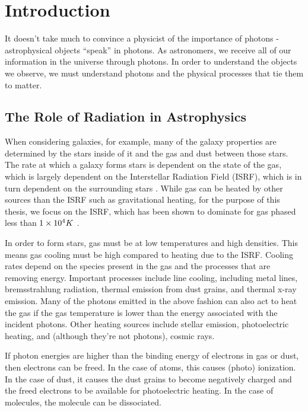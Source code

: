 \pagestyle{fancy}
\headheight 20pt
\chead{}
\lfoot{}
\cfoot{\thepage}
\rfoot{}
\renewcommand{\headrulewidth}{0.1pt}
\renewcommand{\footrulewidth}{0.1pt}

\chapter{Introduction}
\label{chap:intro} 
\thispagestyle{fancy} 

It doesn't take much to convince a physicist of the importance of photons - astrophysical objects ``speak'' in photons. As astronomers, we receive all of our information in the universe through photons. In order to understand the objects we observe, we must understand photons and the physical processes that tie them to matter. 

\section{The Role of Radiation in Astrophysics}
\label{sec:radinastro}

When considering galaxies, for example, many of the galaxy properties are determined by the stars inside of it and the gas and dust between those stars. The rate at which a galaxy forms stars is dependent on the state of the gas, which is largely dependent on the Interstellar Radiation Field (ISRF), which is in turn dependent on the surrounding stars \citep{leithererEt99}. While gas can be heated by other sources than the ISRF such as gravitational heating, for the purpose of this thesis, we focus on the ISRF, which has been shown to dominate for gas phased less than $1\times 10^{4} K$ \citep{wolfireEt03}.

In order to form stars, gas must be at low temperatures and high densities. This means gas cooling must be high compared to heating due to the ISRF. Cooling rates depend on the species present in the gas and the processes that are removing energy. Important processes include line cooling, including metal lines, bremsstrahlung radiation, thermal emission from dust grains, and thermal x-ray emission. Many of the photons emitted in the above fashion can also act to heat the gas if the gas temperature is lower than the energy associated with the incident photons. Other heating sources include stellar emission, photoelectric heating, and (although they're not photons), cosmic rays.

If photon energies are higher than the binding energy of electrons in gas or dust, then electrons can be freed. In the case of atoms, this causes (photo) ionization. In the case of dust, it causes the dust grains to become negatively charged and the freed electrons to be available for photoelectric heating. In the case of molecules, the molecule can be dissociated.


